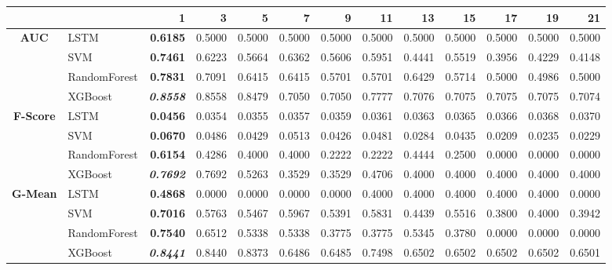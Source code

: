\begin{table}[H]
	\centering
	\begin{adjustbox}{max width=14cm}
		\begin{tabular}{|c|l|r|r|r|r|r|r|r|r|r|r|r|}
			\hline
			&         &      1  &      3  &      5  &      7  &      9  &      11 &      13 &      15 &      17 &      19 &      21 \\
			\hline
			\textbf{AUC} &  LSTM & \textbf{  0.6185 } &  0.5000 &  0.5000 &  0.5000 &  0.5000 &  0.5000 &  0.5000 &  0.5000 &  0.5000 &  0.5000 &  0.5000 \\
			&  SVM & \textbf{  0.7461 } &  0.6223 &  0.5664 &  0.6362 &  0.5606 &  0.5951 &  0.4441 &  0.5519 &  0.3956 &  0.4229 &  0.4148 \\
			&  RandomForest & \textbf{  0.7831 } &  0.7091 &  0.6415 &  0.6415 &  0.5701 &  0.5701 &  0.6429 &  0.5714 &  0.5000 &  0.4986 &  0.5000 \\
			&  XGBoost & \textit{ \textbf{  0.8558 } } &  0.8558 &  0.8479 &  0.7050 &  0.7050 &  0.7777 &  0.7076 &  0.7075 &  0.7075 &  0.7075 &  0.7074 \\
			\hline
			\textbf{F-Score} &  LSTM & \textbf{  0.0456 } &  0.0354 &  0.0355 &  0.0357 &  0.0359 &  0.0361 &  0.0363 &  0.0365 &  0.0366 &  0.0368 &  0.0370 \\
			&  SVM & \textbf{  0.0670 } &  0.0486 &  0.0429 &  0.0513 &  0.0426 &  0.0481 &  0.0284 &  0.0435 &  0.0209 &  0.0235 &  0.0229 \\
			&  RandomForest & \textbf{  0.6154 } &  0.4286 &  0.4000 &  0.4000 &  0.2222 &  0.2222 &  0.4444 &  0.2500 &  0.0000 &  0.0000 &  0.0000 \\
			&  XGBoost & \textit{ \textbf{  0.7692 } } &  0.7692 &  0.5263 &  0.3529 &  0.3529 &  0.4706 &  0.4000 &  0.4000 &  0.4000 &  0.4000 &  0.4000 \\
			\hline
			\textbf{G-Mean} &  LSTM & \textbf{  0.4868 } &  0.0000 &  0.0000 &  0.0000 &  0.0000 &  0.4000 &  0.4000 &  0.4000 &  0.4000 &  0.4000 & 0.0000 \\
			&  SVM & \textbf{  0.7016 } &  0.5763 &  0.5467 &  0.5967 &  0.5391 &  0.5831 &  0.4439 &  0.5516 &  0.3800 &  0.4000 &  0.3942 \\
			&  RandomForest & \textbf{  0.7540 } &  0.6512 &  0.5338 &  0.5338 &  0.3775 &  0.3775 &  0.5345 &  0.3780 &  0.0000 &  0.0000 &  0.0000 \\
			&  XGBoost & \textit{ \textbf{  0.8441 } } &  0.8440 &  0.8373 &  0.6486 &  0.6485 &  0.7498 &  0.6502 &  0.6502 &  0.6502 &  0.6502 &  0.6501 \\

\end{tabular}
\end{adjustbox}
\end{table}
